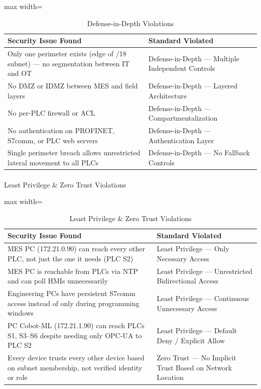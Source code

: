 \begin{table}[H]
\begin{adjustbox}{max width=\textwidth}
\begin{tabular}{@{}p{}p{}@{}}
\toprule
\textbf{Security Issue Found} & \textbf{Standard Violated} \\
\midrule
Only one perimeter exists (edge of /18 subnet) — no segmentation between IT and OT & Defense-in-Depth — Multiple Independent Controls \\
No DMZ or IDMZ between MES and field layers & Defense-in-Depth — Layered Architecture \\
No per-PLC firewall or ACL & Defense-in-Depth — Compartmentalization \\
No authentication on PROFINET, S7comm, or PLC web servers & Defense-in-Depth — Authentication Layer \\
Single perimeter breach allows unrestricted lateral movement to all PLCs & Defense-in-Depth — No Fallback Controls \\
\bottomrule
\end{tabular}
\end{adjustbox}
\caption{Defense-in-Depth Violations}
\end{table}

\paragraph{}{Least Privilege \& Zero Trust Violations}

\begin{table}[H]
\centering
\begin{adjustbox}{max width=\textwidth}
\begin{tabular}{@{}p{}p{}@{}}
\toprule
\textbf{Security Issue Found} & \textbf{Standard Violated} \\
\midrule
MES PC (172.21.0.90) can reach every other PLC, not just the one it needs (PLC S2) & Least Privilege — Only Necessary Access \\
MES PC is reachable from PLCs via NTP and can poll HMIs unnecessarily & Least Privilege — Unrestricted Bidirectional Access \\
Engineering PCs have persistent S7comm access instead of only during programming windows & Least Privilege — Continuous Unnecessary Access \\
PC Cobot-ML (172.21.1.90) can reach PLCs S1, S3–S6 despite needing only OPC-UA to PLC S2 & Least Privilege — Default Deny / Explicit Allow \\
Every device trusts every other device based on subnet membership, not verified identity or role & Zero Trust — No Implicit Trust Based on Network Location \\
\bottomrule
\end{tabular}
\end{adjustbox}
\caption{Least Privilege \& Zero Trust Violations} \end{table}



